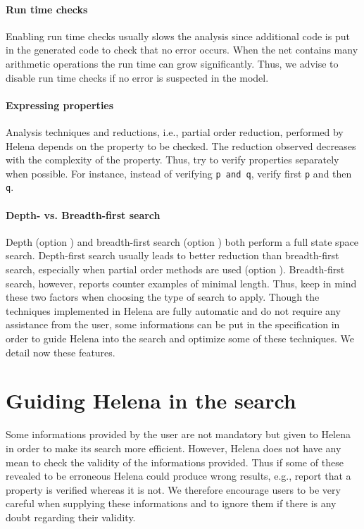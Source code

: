 \paragraph{Run time checks}
Enabling run time checks usually slows the analysis since additional
code is put in the generated code to check that no error occurs. When
the net contains many arithmetic operations the run time can grow
significantly. Thus, we advise to disable run time checks if no error
is suspected in the model.


\paragraph{Expressing properties}
Analysis techniques and reductions, i.e., partial order reduction,
performed by Helena depends on the property to be checked.  The
reduction observed decreases with the complexity of the property.
Thus, try to verify properties separately when possible.  For
instance, instead of verifying \lstinline{p and q}, verify first
\lstinline{p} and then \lstinline{q}.


\paragraph{Depth- vs. Breadth-first search}
Depth (option ) and breadth-first search (option
) both perform a full state space search.
Depth-first search usually leads to better reduction than
breadth-first search, especially when partial order methods are used
(option ).  Breadth-first search, however,
reports counter examples of minimal length.  Thus, keep in mind these
two factors when choosing the type of search to apply.  Though the
techniques implemented in Helena are fully automatic and do not
require any assistance from the user, some informations can be put in
the specification in order to guide Helena into the search and
optimize some of these techniques. We detail now these features.\\


\section{Guiding Helena in the search}
\label{sec:helping-helena}
Some informations provided by the user are not mandatory but given to
Helena in order to make its search more efficient.  However, Helena
does not have any mean to check the validity of the informations
provided.  Thus if some of these revealed to be erroneous Helena could
produce wrong results, e.g., report that a property is verified
whereas it is not.  We therefore encourage users to be very careful
when supplying these informations and to ignore them if there is any
doubt regarding their validity.

